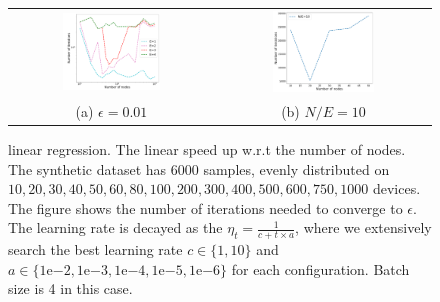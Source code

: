 \begin{figure}
\centering
\begin{tabular}{cc}
\includegraphics[width=0.5\textwidth]{fig/synthetic_linear_regression_1k_6k-epsilon001-logTrue-epoch-1-2-3-4-b4-adapt0.pdf} & 
\includegraphics[width=0.5\textwidth]{fig/iteration_EandN-synthetic_linear_regression_1k_6k-epsilon01.pdf} 
 \\
(a) $\epsilon=0.01$  & (b) $N/E = 10$ 
\end{tabular}
	\caption{linear regression. The linear speed up w.r.t the number of nodes. The synthetic dataset has $6000$ samples, evenly distributed on $10, 20, 30, 40, 50, 60, 80, 100, 200, 300, 400, 500, 600, 750, 1000$ devices. The figure shows the number of iterations needed to converge to $\epsilon$. The learning rate is decayed as the $\eta_t = \frac{1}{c + t \times a}$, where we extensively search the best learning rate $c \in \{1, 10\}$ and $a \in \{1\mathrm{e}{-2}, 1\mathrm{e}{-3}, 1\mathrm{e}{-4}, 1\mathrm{e}{-5}, 1\mathrm{e}{-6}\}$ for each configuration. Batch size is 4 in this case.}
\end{figure}


